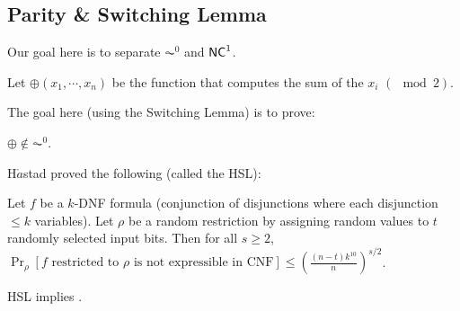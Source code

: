 \subsection{Parity \& Switching Lemma}
Our goal here is to separate $\AC^0$ and ${\mathsf{NC}}^1$.
\newcommand{\ParityF}{\oplus}
\begin{definition}
Let $\ParityF(x_1, \cdots, x_n)$ be the function that computes the sum of the $x_i$ $(\mod 2)$.
\end{definition}
The goal here (using the Switching Lemma) is to prove:
\begin{theorem}
\label{thm:parity_not_in_ac0}
$\ParityF \notin \AC^0$.
\end{theorem}
H$\mathring{a}$stad proved the following (called the HSL):
\begin{theorem}
Let $f$ be a $k$-DNF formula (conjunction of disjunctions where each disjunction $\le k$ variables). Let $\rho$ be a random restriction by assigning random values to $t$ randomly selected input bits. Then for all $s \ge 2$, $\Pr_{\rho}[\text{$f$ restricted to $\rho$ is not expressible in CNF}] \le (\frac{(n-t)k^{10}}{n})^{s/2}$.
\end{theorem}
\begin{lemma}
HSL implies .
\end{lemma}
